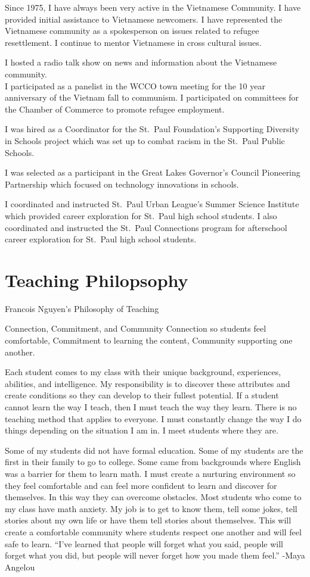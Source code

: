 \documentclass[
]{book}
\begin{document}
Since 1975, I have always been very active in the Vietnamese Community. I have provided initial assistance to Vietnamese newcomers. I have represented the Vietnamese community as a spokesperson on issues related to refugee resettlement. I continue to mentor Vietnamese in cross cultural issues.

I hosted a radio talk show on news and information about the Vietnamese community.\\
I participated as a panelist in the WCCO town meeting for the 10 year anniversary of the Vietnam fall to communism. I participated on committees for the Chamber of Commerce to promote refugee employment.

I was hired as a Coordinator for the St.~Paul Foundation's Supporting Diversity in Schools project which was set up to combat racism in the St.~Paul Public Schools.

I was selected as a participant in the Great Lakes Governor's Council Pioneering Partnership which focused on technology innovations in schools.

I coordinated and instructed St.~Paul Urban League's Summer Science Institute which provided career exploration for St.~Paul high school students. I also coordinated and instructed the St.~Paul Connections program for afterschool career exploration for St.~Paul high school students.

\chapter{Teaching Philopsophy}\label{teaching-philopsophy}

Francois Nguyen's Philosophy of Teaching

Connection, Commitment, and Community
Connection so students feel comfortable,
Commitment to learning the content,
Community supporting one another.

Each student comes to my class with their unique background, experiences, abilities, and intelligence. My responsibility is to discover these attributes and create conditions so they can develop to their fullest potential. If a student cannot learn the way I teach, then I must teach the way they learn. There is no teaching method that applies to everyone. I must constantly change the way I do things depending on the situation I am in. I meet students where they are.

Some of my students did not have formal education. Some of my students are the first in their family to go to college. Some came from backgrounds where English was a barrier for them to learn math. I must create a nurturing environment so they feel comfortable and can feel more confident to learn and discover for themselves. In this way they can overcome obstacles. Most students who come to my class have math anxiety. My job is to get to know them, tell some jokes, tell stories about my own life or have them tell stories about themselves. This will create a comfortable community where students respect one another and will feel safe to learn. ``I've learned that people will forget what you said, people will forget what you did, but people will never forget how you made them feel.'' -Maya Angelou
\end{document}
